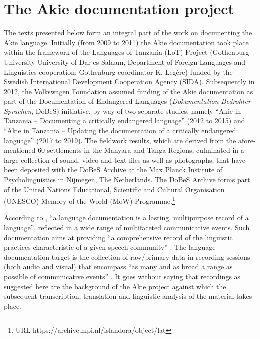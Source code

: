 \documentclass[output=paper,colorlinks,citecolor=brown]{langscibook}
\begin{document}
\section{The Akie documentation project}\label{sec:legere:2}

The texts presented below form an integral part of the work on documenting the Akie language. Initially (from 2009 to 2011) the Akie documentation took place within the framework of the Languages of Tanzania (LoT) Project (Gothenburg University-University of Dar es Salaam, Department of Foreign Languages and Linguistics cooperation; Gothenburg coordinator K. Legère) funded by the Swedish International Development Cooperation Agency (SIDA). Subsequently in 2012, the Volkswagen Foundation assumed funding of the Akie documentation as part of the Documentation of Endangered Languages (\textit{Dokumentation Bedrohter Sprachen}, DoBeS) initiative, by way of two separate studies, namely “Akie in Tanzania – Documenting a critically endangered language” (2012 to 2015) and “Akie in Tanzania – Updating the documentation of a critically endangered language” (2017 to 2019). The fieldwork results, which are derived from the afore-mentioned 60 settlements in the Manyara and Tanga Regions, culminated in a large collection of sound, video and text files as well as photographs, that have been deposited with the DoBeS Archive at the Max Planck Institute of Psycholinguistics in Nijmegen, The Netherlands. The DoBeS Archive forms part of the United Nations Educational, Scientific and Cultural Organisation (UNESCO) Memory of the World (MoW) Programme.\footnote{URL https://archive.mpi.nl/islandora/object/lat}

According to \citep[1]{HimmelmannEtAl2006}, “a language documentation is a lasting, multipurpose record of a language”, reflected in a wide range of multifaceted communicative events. Such documentation aims at providing “a comprehensive record of the linguistic practices characteristic of a given speech community” \citep[166]{Himmelmann1998}. The language documentation target is the collection of raw/primary data in recording sessions (both audio and visual) that encompass “as many and as broad a range as possible of communicative events” \citep[7]{HimmelmannEtAl2006} . It goes without saying that recordings as suggested here are the background of the Akie project against which the subsequent transcription, translation and linguistic analysis of the material takes place.
\end{document}
